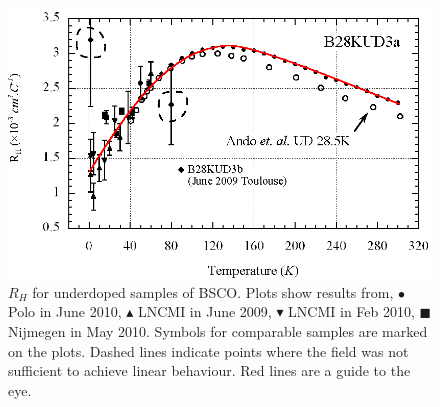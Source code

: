 \begin{figure}[htbp]
	\begin{center}
		\includegraphics[scale=0.9]{Chapter-HallBSCO/Figures/HallIndividual/HallIndividualUD}
		\caption{$R_H$ for underdoped samples of \ac{BSCO}. Plots show results from, $\bullet$ Polo in June 2010, $\blacktriangle$ \ac{LNCMI} in June 2009, $\blacktriangledown$ \ac{LNCMI} in Feb 2010, $\blacksquare$ Nijmegen in May 2010. Symbols for comparable samples are marked on the plots. Dashed lines indicate points where the field was not sufficient to achieve linear behaviour. Red lines are a guide to the eye.}
		\label{Fig:ResH:HallIndividualUD}
	\end{center}
\end{figure}
